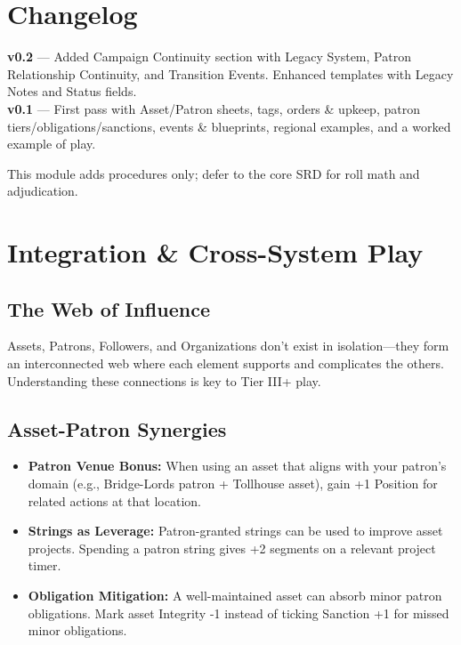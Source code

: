 \documentclass[10pt]{article}
\begin{document}
    \vfill
    \section*{Changelog}
    \textbf{v0.2} --- Added Campaign Continuity section with Legacy System, Patron Relationship Continuity, and Transition Events. Enhanced templates with Legacy Notes and Status fields.\\
    \textbf{v0.1} --- First pass with Asset/Patron sheets, tags, orders \& upkeep, patron tiers/obligations/sanctions, events \& blueprints, regional examples, and a worked example of play.
    
    \begin{center}\small This module adds procedures only; defer to the core SRD for roll math and adjudication.\end{center}
    \section{Integration \& Cross-System Play}

    \subsection{The Web of Influence}
    Assets, Patrons, Followers, and Organizations don't exist in isolation---they form an interconnected web where each element supports and complicates the others. Understanding these connections is key to Tier III+ play.
    
    \subsection{Asset-Patron Synergies}
    \begin{itemize}
    \item \textbf{Patron Venue Bonus:} When using an asset that aligns with your patron's domain (e.g., Bridge-Lords patron + Tollhouse asset), gain +1 Position for related actions at that location.
    \item \textbf{Strings as Leverage:} Patron-granted strings can be used to improve asset projects. Spending a patron string gives +2 segments on a relevant project timer.
    \item \textbf{Obligation Mitigation:} A well-maintained asset can absorb minor patron obligations. Mark asset Integrity -1 instead of ticking Sanction +1 for missed minor obligations.
    \end{itemize}
    
\end{document}
